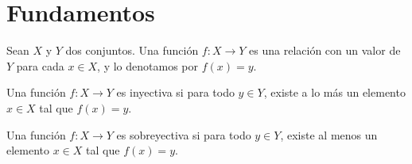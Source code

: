 \section{Fundamentos}

\begin{definition}[Función]
    Sean $X$ y $Y$ dos conjuntos.
    Una función $f : X \to Y$ es una relación con un valor de $Y$ para cada $x \in X$, y lo denotamos por $f(x) = y$.
\end{definition}

\begin{definition}[Inyectiva]
    Una función $f : X \to Y$ es inyectiva si para todo $y \in Y$, existe a lo más un elemento $x \in X$ tal que $f(x) = y$.
\end{definition}

\begin{definition}[Sobreyectiva]
    Una función $f : X \to Y$ es sobreyectiva si para todo $y \in Y$, existe al menos un elemento $x \in X$ tal que $f(x) = y$.
\end{definition}

